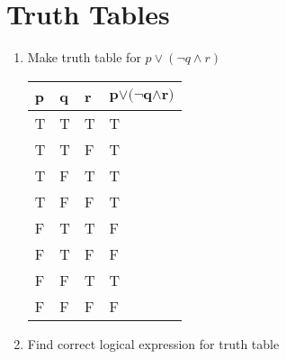 \documentclass[a4paper]{article}
\begin{document}
\bigskip


\section{Truth Tables}
\begin{enumerate}
    \item Make truth table for $p \lor (\neg q \land r)$
    
    \begin{center}
        \begin{tabularx}{0.8\textwidth}{ | >{\centering\arraybackslash} X | >{\centering\arraybackslash} X | >{\centering\arraybackslash} X | >{\centering\arraybackslash} X | }
        \hline
        \textbf{p} & \textbf{q} & \textbf{r} & $\mathbf{p \boldsymbol{\lor} \boldsymbol{(\neg} q \boldsymbol{\land} r\boldsymbol{)}}$ \\ [1ex]
        \hline
        T & T & T & T \\
        \hline
        T & T & F & T \\
        \hline 
        T & F & T & T \\
        \hline
        T & F & F & T \\
        \hline
        F & T & T & F \\
        \hline
        F & T & F & F \\
        \hline
        F & F & T & T \\
        \hline
        F & F & F & F \\
        \hline
        \end{tabularx}
    \end{center}
    \item Find correct logical expression for truth table
    

\end{enumerate}
\end{document}
